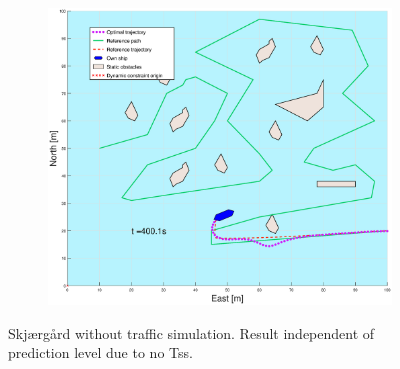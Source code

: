 \begin{figure}[ht]
\begin{subfigure}[b]{0.49\textwidth}
    \end{subfigure}
    \hfill
    \begin{subfigure}[b]{0.499\textwidth}
        \centering
        \includegraphics[width=\textwidth]{Images/Figures/skjergard_u_trafikk/_Simple_1fig999_time=400}
    \end{subfigure}
    \hfill
    \caption{Skjærgård without traffic simulation. Result independent of prediction level due to no \gls{Ts}s.}
\end{figure}
